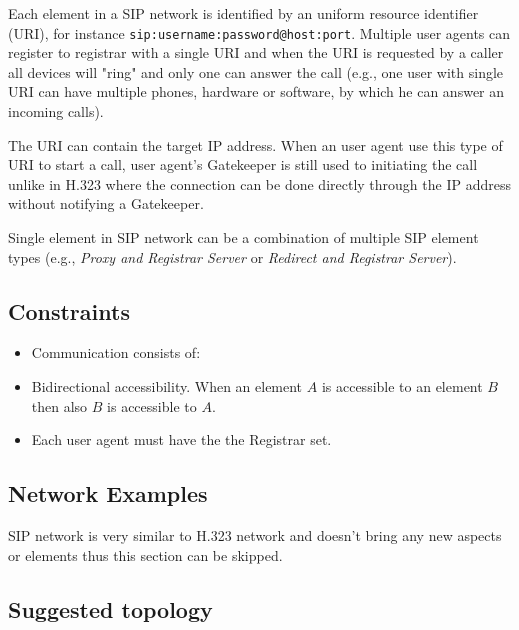 \documentclass[a4paper]{report}
\begin{document}
Each element in a SIP network is identified by an uniform resource identifier (URI), for instance \verb|sip:username:password@host:port|. Multiple user agents can register to registrar with a single URI and when the URI is requested by a caller all devices will "ring" and only one can answer the call (e.g., one user with single URI can have multiple phones, hardware or software, by which he can answer an incoming calls).

The URI can contain the target IP address. When an user agent use this type of URI to start a call, user agent's Gatekeeper is still used to initiating the call unlike in H.323 where the connection can be done directly through the IP address without notifying a Gatekeeper.

Single element in SIP network can be a combination of multiple SIP element types (e.g., \emph{Proxy and Registrar Server} or \emph{Redirect and Registrar Server}).

\subsection{Constraints}

\begin{itemize}

\item Communication consists of:

\item Bidirectional accessibility. When an element $A$ is accessible to an element $B$ then also $B$ is accessible to $A$.

\item Each user agent must have the the Registrar set.

\end{itemize}

\subsection{Network Examples}

SIP network is very similar to H.323 network and doesn't bring any new aspects or elements thus this section can be skipped.

\subsection{Suggested topology}
\end{document}
